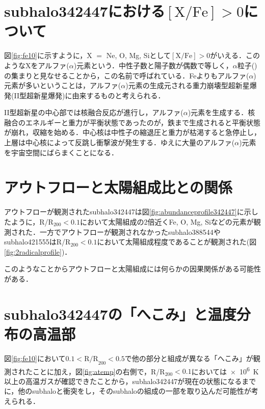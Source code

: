 \section{subhalo342447における$\mathrm{[X/Fe]} > 0$について}

図\ref{fig:fe10}に示すように，X $=$ Ne, O, Mg, Siとして$\mathrm{[X/Fe]} > 0$がいえる．このようなXをアルファ($\alpha$)元素という．中性子数と陽子数が偶数で等しく，$\alpha$粒子()の集まりと見なせることから，この名前で呼ばれている．Feよりもアルファ($\alpha$)元素が多いということは，アルファ($\alpha$)元素の生成元される重力崩壊型超新星爆発(II型超新星爆発)に由来するものと考えられる．

II型超新星の中心部では核融合反応が進行し，アルファ($\alpha$)元素を生成する．核融合のエネルギーと重力が平衡状態であったのが，鉄まで生成されると平衡状態が崩れ，収縮を始める．中心核は中性子の縮退圧と重力が枯渇すると急停止し，上層は中心核によって反跳し衝撃波が発生する．ゆえに大量のアルファ($\alpha$)元素を宇宙空間にばらまくことになる．

\section{アウトフローと太陽組成比との関係}

アウトフローが観測されたsubhalo342447は図\ref{fig:abundanceprofile342447}に示したように，R/R$_{200} < 0.1$において太陽組成の2倍近くFe, O, Mg, Siなどの元素が観測された．一方でアウトフローが観測されなかったsubhalo388544やsubhalo421555はR/R$_{200} < 0.1$において太陽組成程度であることが観測された(図\ref{fig:2radicalprofile})．

このようなことからアウトフローと太陽組成には何らかの因果関係がある可能性がある．

\section{subhalo342447の「へこみ」と温度分布の高温部}

図\ref{fig:fe10}において$0.1<\text{R/R}_{200} < 0.5$で他の部分と組成が異なる「へこみ」が観測されたことに加え，図\ref{fig:atemp}の右側で，R/R$_{200} < 0.1$においては\SI{e6}{K}以上の高温ガスが確認できたことから，subhalo342447が現在の状態になるまでに，他のsubhaloと衝突をし，そのsubhaloの組成の一部を取り込んだ可能性が考えられる．

